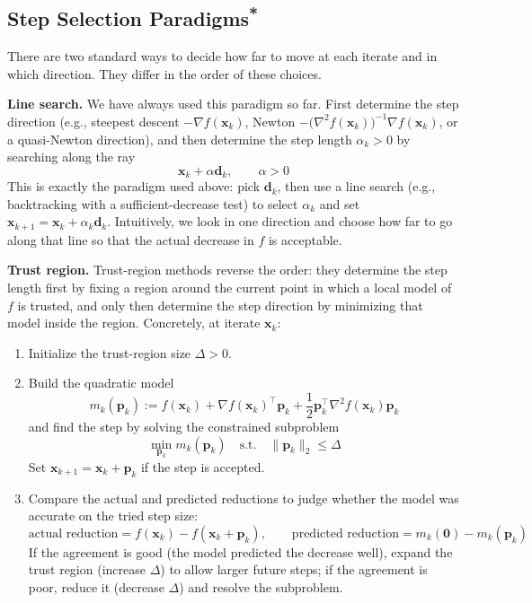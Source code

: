 \subsection{\texorpdfstring{Step Selection Paradigms\textsuperscript{*}}{Step Selection Paradigms}}
\label{sec:step-selection}
There are two standard ways to decide how far to move at each iterate and in which direction. They differ in the order of these choices.

\textbf{Line search.} We have always used this paradigm so far. First determine the step direction (e.g., steepest descent $-\nabla f(\mathbf{x}_k)$, Newton $-\big(\nabla^2 f(\mathbf{x}_k)\big)^{-1}\nabla f(\mathbf{x}_k)$, or a quasi-Newton direction), and then determine the step length $\alpha_k>0$ by searching along the ray
\begin{equation}
    \mathbf{x}_k+\alpha\mathbf{d}_k,\qquad \alpha>0
\end{equation}
This is exactly the paradigm used above: pick $\mathbf{d}_k$, then use a line search (e.g., backtracking with a sufficient-decrease test) to select $\alpha_k$ and set $\mathbf{x}_{k+1}=\mathbf{x}_k+\alpha_k\mathbf{d}_k$. Intuitively, we look in one direction and choose how far to go along that line so that the actual decrease in $f$ is acceptable.

\textbf{Trust region.}
Trust-region methods reverse the order: they determine the step length first by fixing a region around the current point in which a local model of $f$ is trusted, and only then determine the step direction by minimizing that model inside the region. Concretely, at iterate $\mathbf{x}_k$:
\begin{enumerate}
\item Initialize the trust-region size $\Delta>0$.
\item Build the quadratic model
\begin{equation}
    m_k(\mathbf{p}_k)
    := f(\mathbf{x}_k)         
    + \nabla f(\mathbf{x}_k)^{\top}\mathbf{p}_k         
    + \frac{1}{2}\mathbf{p}_k^{\top}\nabla^{2} f(\mathbf{x}_k)\mathbf{p}_k
\end{equation}
and find the step by solving the constrained subproblem
\begin{equation}
    \min_{\mathbf{p}_k} m_k(\mathbf{p}_k)
    \quad\text{s.t.}\quad \|\mathbf{p}_k\|_2 \le \Delta
\end{equation}
Set $\mathbf{x}_{k+1}=\mathbf{x}_k+\mathbf{p}_k$ if the step is accepted.
\item Compare the actual and predicted reductions to judge whether the model was accurate on the tried step size:
\begin{equation}
    \text{actual reduction} = f(\mathbf{x}_k)-f(\mathbf{x}_k+\mathbf{p}_k),\qquad
    \text{predicted reduction} = m_k(\mathbf{0})-m_k(\mathbf{p}_k)
\end{equation}
If the agreement is good (the model predicted the decrease well), expand the trust region (increase $\Delta$) to allow larger future steps; if the agreement is poor, reduce it (decrease $\Delta$) and resolve the subproblem.
\end{enumerate}

